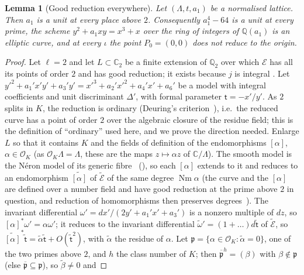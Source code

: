 \documentclass[10pt]{amsart}
\newtheorem{lemma}[theorem]{Lemma}
\theoremstyle{definition}
\theoremstyle{remark}
\newcommand{\C}{\mathbb C}
\newcommand{\Q}{\mathbb Q}
\providecommand{\auNm}{\operatorname{Nm}}
\providecommand{\auO}{\mathcal O}
\providecommand{\aubar}[1]{\overline{#1}}
\begin{document}
\begin{lemma}[Good reduction everywhere]\label{pf:two}
Let $(\Lambda,t,a_1)$ be a normalised lattice. Then $a_1$ is a unit at every place above $2$.
Consequently $a_1^4-64$ is a unit at every prime, the scheme $y^2+a_1xy=x^3+x$ over the ring of
integers of $\Q(a_1)$ is an elliptic curve, and at every $\iota$ the point $P_0=(0,0)$ does not
reduce to the origin.
\end{lemma}
\begin{proof}
Let $\ell=2$ and let $L\subset\C_2$ be a finite extension of $\Q_2$ over which $\mathcal E$ has
all its points of order $2$ and has good reduction; it exists because $j$ is integral
\cite[Chapter~VII, Proposition~5.5]{SilvermanAEC}. Let $y'^2+a_1'x'y'+a_3'y'=x'^3+a_2'x'^2+a_4'x'+a_6'$ be a model with
integral coefficients and unit discriminant $\Delta'$, with formal parameter $\mathsf t=-x'/y'$. As
$2$ splits in $K$, the reduction is ordinary (Deuring's criterion~\cite[Chapter~13, Theorem~12]{LangEF}), i.e.\ the reduced
curve has a point of order $2$ over the algebraic closure of the residue field; this is the
definition of ``ordinary'' used here, and we prove the direction needed. Enlarge $L$ so that it
contains $K$ and the fields of definition of the endomorphisms $[\alpha]$, $\alpha\in\auO_K$ (as
$\auO_K\Lambda=\Lambda$, these are the maps $z\mapsto\alpha z$ of $\C/\Lambda$). The smooth model
is the N\'eron model of its generic fibre~\cite[\S1.2, Definition~1, p.~12, and Proposition~8, p.~15]{BLR} (\cite[IV, Corollary~6.3, p.~329, and the N\'eron mapping property, p.~319]{SilvermanAT}), so each $[\alpha]$ extends to it and
reduces to an endomorphism $\widetilde{[\alpha]}$ of $\widetilde{\mathcal E}$ of the same degree
$\auNm\alpha$ (the curve and the $[\alpha]$ are defined over a number field and have good
reduction at the prime above $2$ in question, and reduction of homomorphisms then preserves
degrees~\cite[Chapter~II, Proposition~4.4]{SilvermanAT}). The invariant differential $\omega'=dx'/(2y'+a_1'x'+a_3')$ is a
nonzero multiple of $dz$, so $[\alpha]^*\omega'=\alpha\omega'$; it reduces to the invariant
differential $\tilde\omega'=(1+\dots)d\tilde{\mathsf t}$ of $\widetilde{\mathcal E}$, so
$\widetilde{[\alpha]}^*\tilde{\mathsf t}=\tilde\alpha\tilde{\mathsf t}+O(\tilde{\mathsf t}^2)$, with
$\tilde\alpha$ the residue of $\alpha$. Let $\mathfrak p=\{\alpha\in\auO_K:\tilde\alpha=0\}$, one of
the two primes above $2$, and $h$ the class number of $K$; then $\aubar{\mathfrak p}^h=(\beta)$ with
$\beta\notin\mathfrak p$ (else $\aubar{\mathfrak p}\subseteq\mathfrak p$), so $\tilde\beta\neq0$ and

\end{proof}
\end{document}
